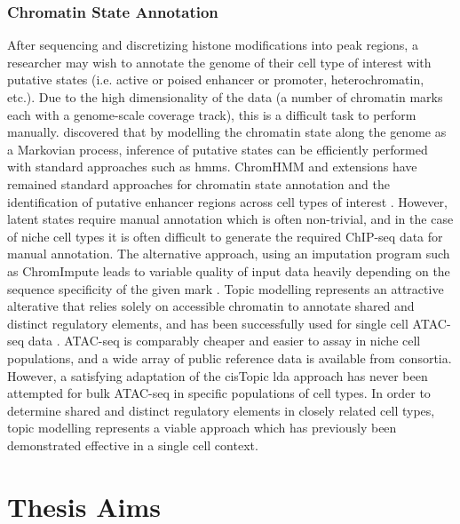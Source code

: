 \subsubsection{Chromatin State Annotation}

After sequencing and discretizing histone modifications into peak regions, a researcher may wish to annotate the genome of their cell type of interest with putative states (i.e. active or poised enhancer or promoter, heterochromatin, etc.). Due to the high dimensionality of the data (a number of chromatin marks each with a genome-scale coverage track), this is a difficult task to perform manually. \textcite{Ernst2012} discovered that by modelling the chromatin state along the genome as a Markovian process, inference of putative states can be efficiently performed with standard approaches such as \glspl{hmm}. ChromHMM and extensions have remained standard approaches for chromatin state annotation and the identification of putative enhancer regions across cell types of interest \cite{Ernst2017}. However, latent states require manual annotation which is often non-trivial, and in the case of niche cell types it is often difficult to generate the required ChIP-seq data for manual annotation. The alternative approach, using an imputation program such as ChromImpute leads to variable quality of input data heavily depending on the sequence specificity of the given mark \cite{Ernst2017}.  Topic modelling represents an attractive alterative that relies solely on accessible chromatin to annotate shared and distinct regulatory elements, and has been successfully used for single cell ATAC-seq data \cite{BravoGonzalez-Blas2019}. ATAC-seq is comparably cheaper and easier to assay in niche cell populations, and a wide array of public reference data is available from consortia.  However, a satisfying adaptation of the cisTopic \gls{lda} approach has never been attempted for bulk ATAC-seq in specific populations of cell types. In order to determine shared and distinct regulatory elements in closely related cell types, topic modelling represents a viable approach which has previously been demonstrated effective in a single cell context.

\section{Thesis Aims}

